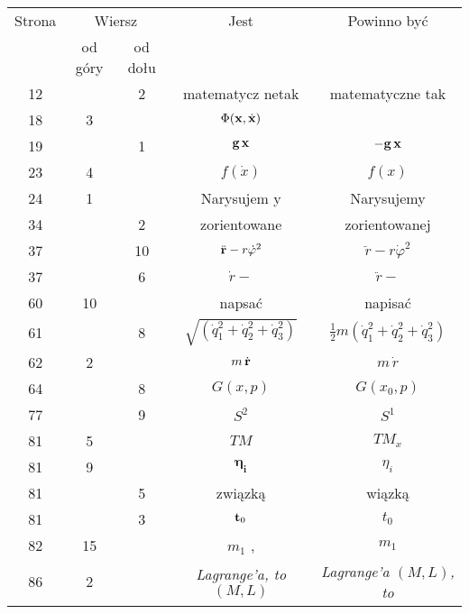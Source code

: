 \documentclass[a4paper,11pt]{article}
\numberwithin{equation}{section}
\begin{document}
\newpage



\begin{center}

  \begin{tabular}{|c|c|c|c|c|}
    \hline
    Strona & \multicolumn{2}{c|}{Wiersz} & Jest
                              & Powinno być \\ \cline{2-3}
    & od góry & od dołu & & \\
    \hline
    12  & &  2 & matematycz netak & matematyczne tak \\
    18  &  3 & & $\Phi( \mathbf{x}, \dot{ \mathbf{x} } )$
    & %
    \\
    19  & &  1 & $\mathbf{g}\, \mathbf{x}$ & $-\mathbf{g}\, \mathbf{x}$ \\
    23  &  4 & & $f( \dot{ x } )$ & $f( x )$ \\
    24  &  1 & & Narysujem y & Narysujemy \\
    34  & &  2 & zorientowane & zorientowanej \\
    37  & & 10 & $\ddot{ \mathbf{r} } - r \dot{ \varphi }^{ 2 }$
           & $\ddot{ r } - r \dot{ \varphi }^{ 2 }$ \\
    37  & &  6 & $\dot{ r } -$ & $\ddot{ r } -$ \\
    60  & 10 & & napsać & napisać \\
    61  & &  8 & $\sqrt{ ( \dot{ q }_{ 1 }^{ 2 } + \dot{ q }_{ 2 }^{ 2 }
                 + \dot{ q }_{ 3 }^{ 2 } ) }$
           & $\frac{ 1 }{ 2 } m ( \dot{ q }_{ 1 }^{ 2 } + \dot{ q }_{ 2 }^{ 2 }
             + \dot{ q }_{ 3 }^{ 2 } )$ \\
    62  &  2 & & $m\, \dot{ \mathbf{r} }$ & $m\, \dot{ r }$ \\
    64  & &  8 & $G( x, p )$ & $G( x_{ 0 }, p )$ \\
    77  & &  9 & $S^{ 2 }$ & $S^{ 1 }$ \\
    81  &  5 & & $TM$ & $TM_{ x }$ \\
    81  &  9 & & $\mathbf{ \eta_{ i } }$ & $\eta_{ i }$ \\
    81  & &  5 & związką & wiązką \\
    81  & &  3 & $\mathbf{t}_{ 0 }$ & $t_{ 0 }$ \\
    82  & 15 & & $m_{ 1 }${  }, & $m_{ 1 }$ \\
    86  &  2 & & \textit{Lagrange’a, to $( M, L )$}
           & \textit{Lagrange’a $( M, L )$, to} \\

\end{tabular}
\end{center}
\end{document}

